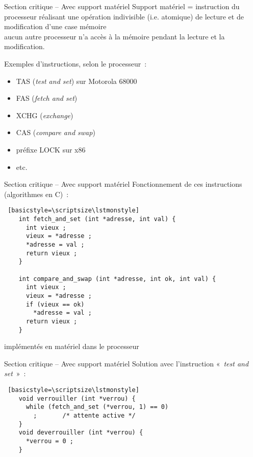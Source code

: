 \begin {frame} {Section critique -- Avec support matériel}
    Support matériel = instruction du processeur réalisant une
    opération indivisible (i.e. atomique) de lecture et de modification
    d'une case mémoire
    \\
    \implique aucun autre processeur n'a accès à la mémoire pendant
    la lecture et la modification.

    \vspace* {3mm}

    Exemples d'instructions, selon le processeur~:
    \begin {itemize}
	\item TAS (\emph {test and set}) sur Motorola 68000
	\item FAS (\emph {fetch and set})
	\item XCHG (\emph {exchange})
	\item CAS (\emph {compare and swap})
	\item préfixe LOCK sur x86
	\item etc.
    \end {itemize}

\end {frame}

\begin {frame} [fragile] {Section critique -- Avec support matériel}
    Fonctionnement de ces instructions (algorithmes en C)~:

    \begin {lstlisting} [basicstyle=\scriptsize\lstmonstyle]
    int fetch_and_set (int *adresse, int val) {
      int vieux ;
      vieux = *adresse ;
      *adresse = val ;
      return vieux ;
    }

    int compare_and_swap (int *adresse, int ok, int val) {
      int vieux ;
      vieux = *adresse ;
      if (vieux == ok)
        *adresse = val ;
      return vieux ;
    }
    \end{lstlisting}

    \implique implémentés en matériel dans le processeur

\end{frame}


\begin {frame} [fragile] {Section critique -- Avec support matériel}
    Solution avec l'instruction «~\emph {test and set}~»~:

    \begin {lstlisting} [basicstyle=\scriptsize\lstmonstyle]
    void verrouiller (int *verrou) {
      while (fetch_and_set (*verrou, 1) == 0)
        ;       /* attente active */
    }
    void deverrouiller (int *verrou) {
      *verrou = 0 ;
    }
    \end{lstlisting}

\end{frame}

